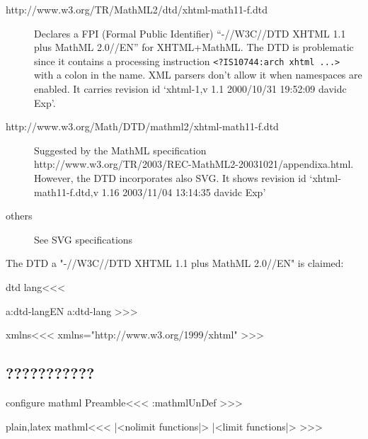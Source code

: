\begin{description}



\item [http://www.w3.org/TR/MathML2/dtd/xhtml-math11-f.dtd]

Declares a  FPI (Formal Public Identifier)
``-//W3C//DTD XHTML 1.1 plus MathML 2.0//EN'' for XHTML+MathML. 
The DTD is problematic
since it contains a processing instruction
\verb!<?IS10744:arch xhtml ...>!  with a colon in the name. XML 
parsers don't allow it when namespaces are enabled. It carries 
revision id `xhtml-1,v 1.1 2000/10/31 19:52:09 davidc Exp'.

\item[http://www.w3.org/Math/DTD/mathml2/xhtml-math11-f.dtd]

Suggested by the MathML 
specification
 http://www.w3.org/TR/2003/REC-MathML2-20031021/appendixa.html.  However, the
DTD incorporates also SVG.  It shows revision id
`xhtml-math11-f.dtd,v 1.16 2003/11/04 13:14:35 davidc Exp'

\item [others]

See SVG specifications
\end{description}

The DTD 
a   "-//W3C//DTD XHTML 1.1 plus MathML 
2.0//EN" is claimed: 





\<dtd lang\><<<
\expandafter
\ifx \csname a:dtd-lang\endcsname\relax EN\else
  \csname a:dtd-lang\endcsname
\fi
>>>


\<xmlns\><<<
xmlns="http://www.w3.org/1999/xhtml"
>>>









\subsection{???????????}




\<configure mathml Preamble\><<<
\ifx \a:mathml\:UnDef
\fi 
\def\mml:class{\a:mathml class}
>>>


\<plain,latex mathml\><<<
|<nolimit functions|>
|<limit functions|>
>>>


